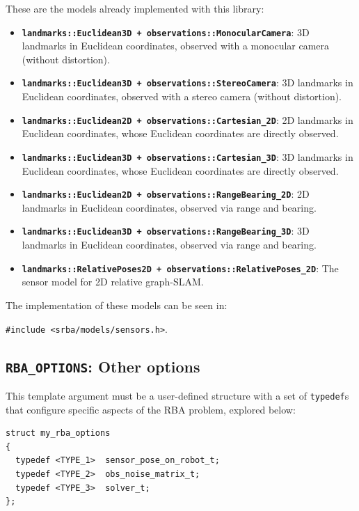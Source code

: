 \documentclass[a4paper,11pt]{article}
\begin{document}
These are the models already implemented with this library: 

\begin{itemize}
\item{\textbf{ \texttt{landmarks::Euclidean3D + observations::MonocularCamera}}: 3D landmarks in Euclidean coordinates, observed 
with a monocular camera (without distortion).}
\item{\textbf{ \texttt{landmarks::Euclidean3D + observations::StereoCamera}}: 3D landmarks in Euclidean coordinates, observed 
with a stereo camera (without distortion).}
\item{\textbf{ \texttt{landmarks::Euclidean2D + observations::Cartesian\_2D}}: 2D landmarks in Euclidean coordinates, whose
Euclidean coordinates are directly observed.}
\item{\textbf{ \texttt{landmarks::Euclidean3D + observations::Cartesian\_3D}}: 3D landmarks in Euclidean coordinates, whose
Euclidean coordinates are directly observed.}
\item{\textbf{ \texttt{landmarks::Euclidean2D + observations::RangeBearing\_2D}}: 2D landmarks in Euclidean coordinates, observed
via range and bearing.}
\item{\textbf{ \texttt{landmarks::Euclidean3D + observations::RangeBearing\_3D}}: 3D landmarks in Euclidean coordinates, observed
via range and bearing.}
\item{\textbf{ \texttt{landmarks::RelativePoses2D + observations::RelativePoses\_2D}}: The sensor model for 2D relative graph-SLAM.}
\end{itemize}

The implementation of these models can be seen in:

\texttt{\#include <srba/models/sensors.h>}.


\subsection{\texttt{RBA\_OPTIONS}: Other options}
\label{sect:rba_options}

This template argument must be a user-defined structure with a set of \texttt{typedef}s 
that configure specific aspects of the RBA problem, explored below:

\begin{lstlisting}
struct my_rba_options
{
  typedef <TYPE_1>  sensor_pose_on_robot_t;
  typedef <TYPE_2>  obs_noise_matrix_t;
  typedef <TYPE_3>  solver_t;
};
\end{lstlisting}
\end{document}
